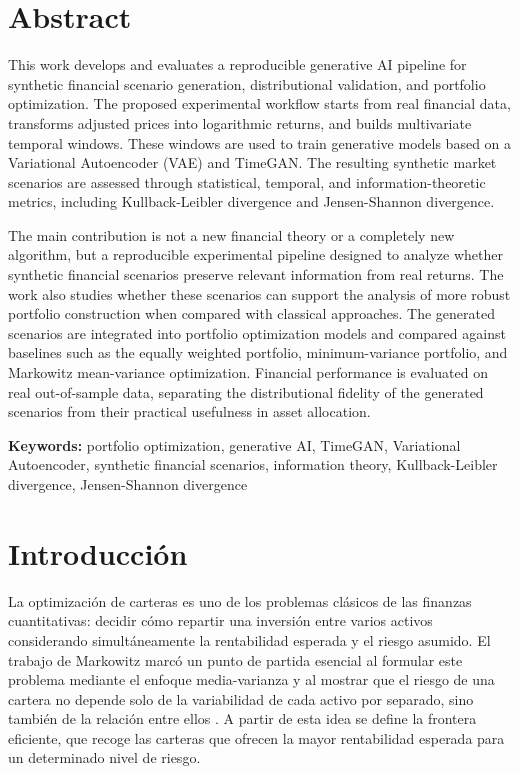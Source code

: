 \documentclass[11pt,a4paper,spanish,oneside]{book}
\numberwithin{equation}{chapter}
\numberwithin{figure}{chapter}
\begin{document}
\chapter{Abstract}
This work develops and evaluates a reproducible generative AI pipeline for synthetic financial scenario generation, distributional validation, and portfolio optimization. The proposed experimental workflow starts from real financial data, transforms adjusted prices into logarithmic returns, and builds multivariate temporal windows. These windows are used to train generative models based on a Variational Autoencoder (VAE) and TimeGAN. The resulting synthetic market scenarios are assessed through statistical, temporal, and information-theoretic metrics, including Kullback-Leibler divergence and Jensen-Shannon divergence.

The main contribution is not a new financial theory or a completely new algorithm, but a reproducible experimental pipeline designed to analyze whether synthetic financial scenarios preserve relevant information from real returns. The work also studies whether these scenarios can support the analysis of more robust portfolio construction when compared with classical approaches. The generated scenarios are integrated into portfolio optimization models and compared against baselines such as the equally weighted portfolio, minimum-variance portfolio, and Markowitz mean-variance optimization. Financial performance is evaluated on real out-of-sample data, separating the distributional fidelity of the generated scenarios from their practical usefulness in asset allocation.

{\bf Keywords:} portfolio optimization, generative AI, TimeGAN, Variational Autoencoder, synthetic financial scenarios, information theory, Kullback-Leibler divergence, Jensen-Shannon divergence


\mainmatter
\chapter{Introducción}

La optimización de carteras es uno de los problemas clásicos de las finanzas cuantitativas: decidir cómo repartir una inversión entre varios activos considerando simultáneamente la rentabilidad esperada y el riesgo asumido. El trabajo de Markowitz marcó un punto de partida esencial al formular este problema mediante el enfoque media-varianza y al mostrar que el riesgo de una cartera no depende solo de la variabilidad de cada activo por separado, sino también de la relación entre ellos \cite{Markowitz1952}. A partir de esta idea se define la frontera eficiente, que recoge las carteras que ofrecen la mayor rentabilidad esperada para un determinado nivel de riesgo.
\end{document}
